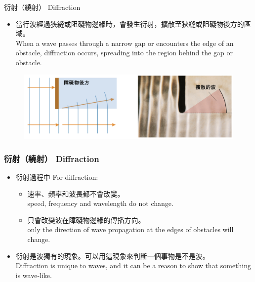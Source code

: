 \documentclass[beamer=true]{standalone}
\begin{document}
\begin{frame}{衍射（繞射） Diffraction}
    \begin{itemize}
        \item 當行波經過狹縫或阻礙物邊緣時，會發生衍射，擴散至狹縫或阻礙物後方的區域。\\When a wave passes through a narrow gap or encounters the edge of an obstacle, diffraction occurs, spreading into the region behind the gap or obstacle.

    \end{itemize}
    \begin{figure}
        \centering
        \includegraphics[width=1\linewidth]{images/Screenshot 2023-09-27 at 9.46.49 PM.png}


    \end{figure}
\end{frame}

\begin{frame}
    \frametitle{衍射（繞射） Diffraction}
    \begin{itemize}
        \item 衍射過程中 For diffraction:
              \begin{itemize}
                  \item 速率、頻率和波長都不會改變。\\ speed, frequency and wavelength do not change.
                  \item 只會改變波在障礙物邊緣的傳播方向。\\only the direction of wave propagation at the edges of obstacles will change.
              \end{itemize}
        \item 衍射是波獨有的現象。可以用這現象來判斷一個事物是不是波。\\Diffraction is unique to waves, and it can be a reason to show that something is wave-like.
    \end{itemize}

\end{frame}
\end{document}
